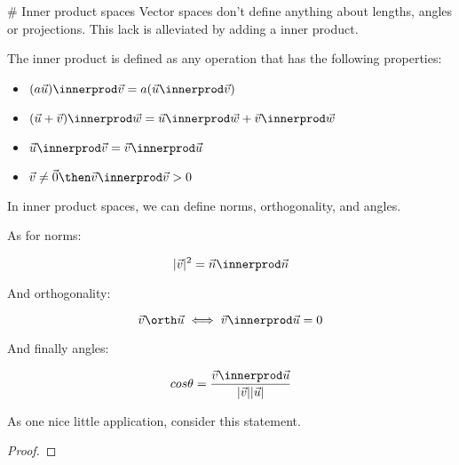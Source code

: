 \begin{theorem}
\end{theorem}

\begin{theorem}
\end{theorem}









# Inner product spaces
Vector spaces don't define anything about lengths, angles or projections. This lack is alleviated by adding a inner product. 

\begin{definition} The inner product is defined as any operation that has the following properties:
\begin{itemize}
    \item $(a\vec{u}) \innerprod \vec{v} = a (\vec{u} \innerprod \vec{v}) $
    \item $(\vec{u} + \vec{v}) \innerprod \vec{w} = \vec{u} \innerprod \vec{w} + \vec{v} \innerprod \vec{w}$
    \item $\vec{u} \innerprod \vec{v} = \vec{v} \innerprod \vec{u}$
    \item $\vec{v} \neq \vec{0} \then \vec{v} \innerprod \vec{v} > 0$
\end{itemize}
\end{definition}

In inner product spaces, we can define norms, orthogonality, and angles. 

As for norms:

$$ |\vec{v}|^2 = \vec{n} \innerprod \vec{n} $$

And orthogonality:

$$ \vec{v} \orth \vec{u} \iff \vec{v} \innerprod \vec{u} = 0$$

And finally angles: 

$$ cos\theta = \frac{\vec{v} \innerprod \vec{u}}{|\vec{v}||\vec{u}|}$$



As one nice little application, consider this statement. 
\begin{proof}
\end{proof}

